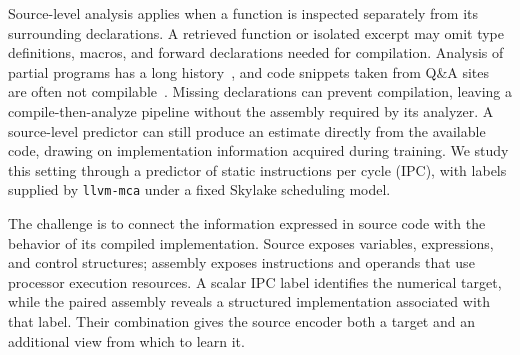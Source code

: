 \documentclass[conference]{IEEEtran}
\newenvironment{newtext}{\begingroup}{\endgroup}
\newcommand{\llvmmca}{\texttt{llvm-mca}}
\begin{document}
\begin{newtext}
Source-level analysis applies when a function is inspected separately from its surrounding declarations. A retrieved function or isolated excerpt may omit type definitions, macros, and forward declarations needed for compilation. Analysis of partial programs has a long history~\cite{dagenais2008partial}, and code snippets taken from Q\&A sites are often not compilable~\cite{terragni2016csnippex}. Missing declarations can prevent compilation, leaving a compile-then-analyze pipeline without the assembly required by its analyzer. A source-level predictor can still produce an estimate directly from the available code, drawing on implementation information acquired during training. We study this setting through a predictor of static instructions per cycle (IPC), with labels supplied by \llvmmca{} under a fixed Skylake scheduling model.
\end{newtext}

The challenge is to connect the information expressed in source code with the behavior of its compiled implementation. Source exposes variables, expressions, and control structures; assembly exposes instructions and operands that use processor execution resources. A scalar IPC label identifies the numerical target, while the paired assembly reveals a structured implementation associated with that label. Their combination gives the source encoder both a target and an additional view from which to learn it.
\end{document}
